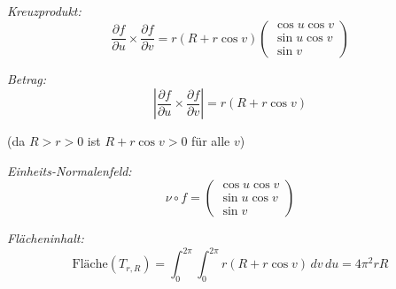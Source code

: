 \documentclass{article}
\newcommand{\del}{\partial}
\begin{document}
\textit{Kreuzprodukt:}
$$\frac{\del f}{\del u} \times \frac{\del f}{\del v} = r(R + r\cos v)\begin{pmatrix}
\cos u \cos v \\
\sin u \cos v \\
\sin v
\end{pmatrix}$$

\textit{Betrag:}
$$\left|\frac{\del f}{\del u} \times \frac{\del f}{\del v}\right| = r(R + r\cos v)$$

(da $R > r > 0$ ist $R + r\cos v > 0$ für alle $v$)

\textit{Einheits-Normalenfeld:}
$$\nu \circ f = \begin{pmatrix}
\cos u \cos v \\
\sin u \cos v \\
\sin v
\end{pmatrix}$$

\textit{Flächeninhalt:}
$$\text{Fläche}(T_{r,R}) = \int_0^{2\pi} \int_0^{2\pi} r(R + r\cos v) \, dv \, du = 4\pi^2 rR$$
\end{document}
